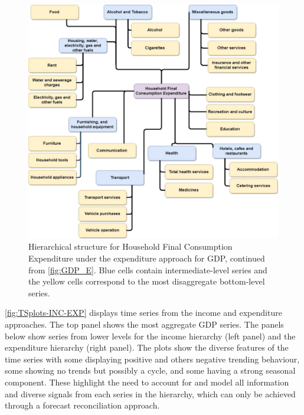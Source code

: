 \documentclass[a4paper, 11pt]{article}
\begin{document}
\begin{figure}[!t]
	\centering
	\includegraphics[width=.9\textwidth]{Figs/Hierarchical-structures/HFCE.pdf}
	\caption{Hierarchical structure for Household Final Consumption Expenditure under the expenditure approach for GDP, continued from \autoref{fig:GDP_E}. Blue cells contain intermediate-level series and the yellow cells correspond to the most disaggregate bottom-level series.}\label{fig:HFCE}
\end{figure}

\autoref{fig:TSplots-INC-EXP} displays time series from the income and expenditure approaches. The top panel shows the most aggregate GDP series. The panels below show series from lower levels for the income hierarchy (left panel) and the expenditure hierarchy (right panel). The plots show the diverse features of the time series with some displaying positive and others negative trending behaviour, some showing no trends but possibly a cycle, and some having a strong seasonal component. These highlight the need to account for and model all information and diverse signals from each series in the hierarchy, which can only be achieved through a forecast reconciliation approach.
\end{document}
